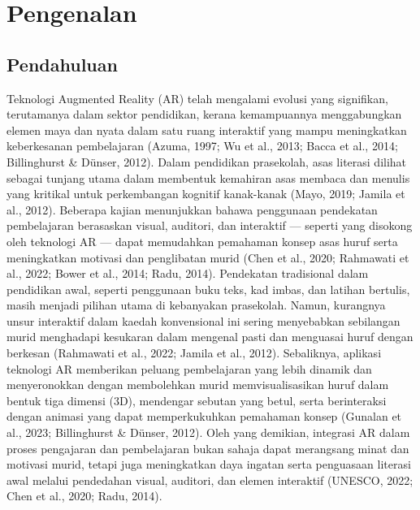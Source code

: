\chapter{Pengenalan}
\label{bab:pengenalan}

\section{Pendahuluan}
Teknologi Augmented Reality (AR) telah mengalami evolusi yang signifikan, terutamanya dalam sektor pendidikan, kerana kemampuannya menggabungkan elemen maya dan nyata dalam satu ruang interaktif yang mampu meningkatkan keberkesanan pembelajaran (Azuma, 1997; Wu et al., 2013; Bacca et al., 2014; Billinghurst \& Dünser, 2012). Dalam pendidikan prasekolah, asas literasi dilihat sebagai tunjang utama dalam membentuk kemahiran asas membaca dan menulis yang kritikal untuk perkembangan kognitif kanak-kanak (Mayo, 2019; Jamila et al., 2012). Beberapa kajian menunjukkan bahawa penggunaan pendekatan pembelajaran berasaskan visual, auditori, dan interaktif — seperti yang disokong oleh teknologi AR — dapat memudahkan pemahaman konsep asas huruf serta meningkatkan motivasi dan penglibatan murid (Chen et al., 2020; Rahmawati et al., 2022; Bower et al., 2014; Radu, 2014).
Pendekatan tradisional dalam pendidikan awal, seperti penggunaan buku teks, kad imbas, dan latihan bertulis, masih menjadi pilihan utama di kebanyakan prasekolah. Namun, kurangnya unsur interaktif dalam kaedah konvensional ini sering menyebabkan sebilangan murid menghadapi kesukaran dalam mengenal pasti dan menguasai huruf dengan berkesan (Rahmawati et al., 2022; Jamila et al., 2012). Sebaliknya, aplikasi teknologi AR memberikan peluang pembelajaran yang lebih dinamik dan menyeronokkan dengan membolehkan murid memvisualisasikan huruf dalam bentuk tiga dimensi (3D), mendengar sebutan yang betul, serta berinteraksi dengan animasi yang dapat memperkukuhkan pemahaman konsep (Gunalan et al., 2023; Billinghurst \& Dünser, 2012). Oleh yang demikian, integrasi AR dalam proses pengajaran dan pembelajaran bukan sahaja dapat merangsang minat dan motivasi murid, tetapi juga meningkatkan daya ingatan serta penguasaan literasi awal melalui pendedahan visual, auditori, dan elemen interaktif (UNESCO, 2022; Chen et al., 2020; Radu, 2014).
